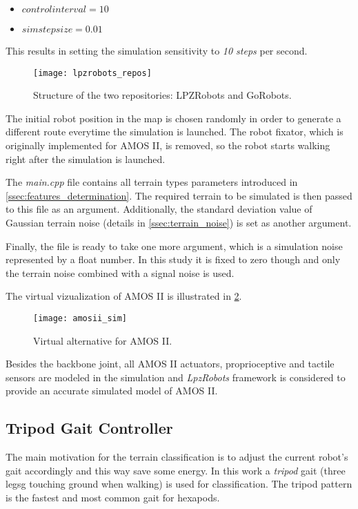 \begin{itemize}
\item $ controlinterval = 10 $
\item $ simstepsize = 0.01 $
\end{itemize}

This results in setting the simulation sensitivity to \textit{10 steps} per second.

\begin{figure}[H]
  \centering
  \texttt{[image: lpzrobots\_repos]}
  \caption{Structure of the two repositories: LPZRobots and GoRobots. \citep{misc:lpzrobots}}
  \label{img:lpzrobots_repos}
\end{figure}

The initial robot position in the map is chosen randomly in order to generate a different route everytime the simulation is launched. The robot fixator, which is originally implemented for AMOS II, is removed, so the robot starts walking right after the simulation is launched.

The \textit{main.cpp} file contains all terrain types parameters introduced in \cref{ssec:features_determination}. The required terrain to be simulated is then passed to this file as an argument. Additionally, the standard deviation value of Gaussian terrain noise (details in \cref{ssec:terrain_noise}) is set as another argument. 

Finally, the file is ready to take one more argument, which is a simulation noise represented by a float number. In this study it is fixed to zero though and only the terrain noise combined with a signal noise is used.

The virtual vizualization of AMOS II is illustrated in \cref{img:amosii_sim}.

\begin{figure}[H]
  \centering
  \texttt{[image: amosii\_sim]}
  \caption{Virtual alternative for AMOS II.}
  \label{img:amosii_sim}
\end{figure}

Besides the backbone joint, all AMOS II actuators, proprioceptive and tactile sensors are modeled in the simulation and \textit{LpzRobots} framework is considered to provide an accurate simulated model of AMOS II.

\subsection{Tripod Gait Controller} \label{ssec:tripod_gait_controller}
The main motivation for the terrain classification is to adjust the current robot's gait accordingly and this way save some energy. In this work a \textit{tripod} gait (three legsg touching ground when walking) is used for classification. The tripod pattern is the fastest and most common gait for hexapods.

